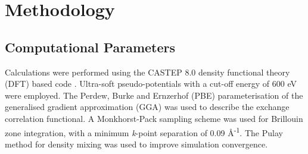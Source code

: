 \documentclass[11pt,a4paper]{article}
\newcommand{\zirconia}{ZrO\textsubscript{2}}
\begin{document}

\section{\label{Method}Methodology}

\subsection{Computational Parameters}

Calculations were performed using the CASTEP 8.0 density functional theory (DFT) based code \cite{Clark2005}. Ultra-soft pseudo-potentials with a cut-off energy of 600 eV were employed. The Perdew, Burke and Ernzerhof (PBE) \cite{Perdew1996} parameterisation of the generalised gradient approximation (GGA) was used to describe the exchange correlation functional. A Monkhorst-Pack sampling scheme \cite{Monkhorst1976} was used for Brillouin zone integration, with a minimum \emph{k}-point separation of 0.09 \r{A}\textsuperscript{-1}. The Pulay method for density mixing \cite{Pulay1980} was used to improve simulation convergence. \\
\end{document}

